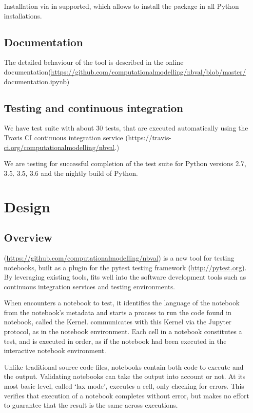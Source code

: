 \documentclass{deliverablereport}
\begin{document}
Installation via  in supported, which allows to install the
package in all Python installations.
\subsection{Documentation}
The detailed behaviour of the tool is described in the online
documentation\newline(\href{https://github.com/computationalmodelling/nbval/blob/master/documentation.ipynb}{https://github.com/computationalmodelling/nbval/blob/master/documentation.ipynb})
\subsection{Testing and continuous integration}
We have test suite with about 30 tests, that are executed
automatically using the Travis CI continuous integration service
(\href{https://travis-ci.org/computationalmodelling/nbval}{https://travis-ci.org/computationalmodelling/nbval}.)

We are testing for successful completion of the test suite for
Python versions 2.7, 3.5, 3.5, 3.6 and the nightly build of Python.

\section{Design}
\subsection{Overview}
\nbval (\url{https://github.com/computationalmodelling/nbval}) is a
new tool for testing notebooks, built as a plugin for the pytest
testing framework (\url{http://pytest.org}).  By leveraging existing
tools, \nbval fits well into the software development tools such as
continuous integration services and testing environments.

When \nbval encounters a notebook to test, it identifies the language
of the notebook from the notebook's metadata and starts a process to
run the code found in notebook, called the Kernel.  \nbval
communicates with this Kernel via the Jupyter protocol, as in the
notebook environment.  Each cell in a notebook constitutes a test, and
is executed in order, as if the notebook had been executed in the
interactive notebook environment.

Unlike traditional source code files, notebooks contain both code to
execute and the output.  Validating notebooks can take the output into
account or not.  At its most basic level, called `lax mode', \nbval
executes a cell, only checking for errors.  This verifies that
execution of a notebook completes without error, but makes no effort
to guarantee that the result is the same across executions.
\end{document}
